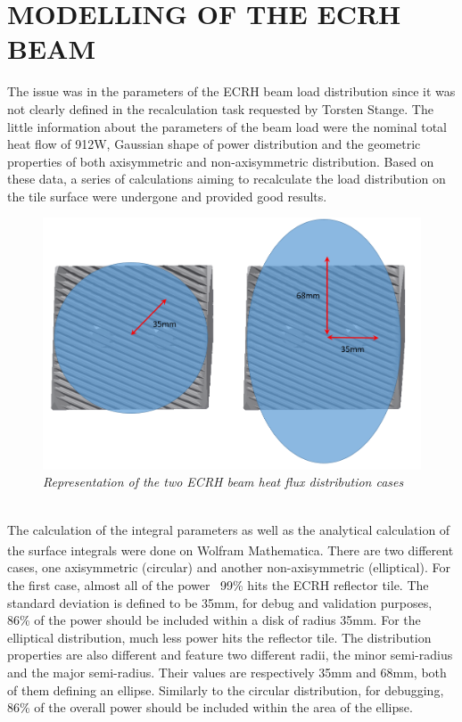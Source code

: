 \section{MODELLING OF THE ECRH BEAM}
\normalsize{The issue was in the parameters of the \acrshort{ECRH} beam load distribution since it was not clearly defined in the recalculation task requested by Torsten Stange. The little information about the parameters of the beam load were the nominal total heat flow of 912W, Gaussian shape of power distribution and the geometric properties of both axisymmetric and non-axisymmetric distribution. Based on these data, a series of calculations aiming to recalculate the load distribution on the tile surface  were undergone and provided good results.}
\begin{figure}[h!]
    \label{fig_4_1} 
    \centering
    \includegraphics[width=.9\textwidth]{figures/TWOBEAMDISTRI.png}
    \caption{\it Representation of the two ECRH beam heat flux distribution cases}
\end{figure}
\\
\normalsize{\indent The calculation of the integral parameters as well as the analytical calculation of the surface integrals were done on Wolfram Mathematica\textsuperscript{\textregistered}. There are two different cases, one axisymmetric (circular) and another non-axisymmetric (elliptical). For the first case, almost all of the power ~99\% hits the ECRH reflector tile. The standard deviation is defined to be 35mm, for debug and validation purposes, 86\% of the power should be included within a disk of radius 35mm. For the elliptical distribution, much less power hits the reflector tile. The distribution properties are also different and feature two different radii, the minor semi-radius and the major semi-radius. Their values are respectively 35mm and 68mm, both of them defining an ellipse. Similarly to the circular distribution, for debugging, 86\% of the overall power should be included within the area of the ellipse.}
